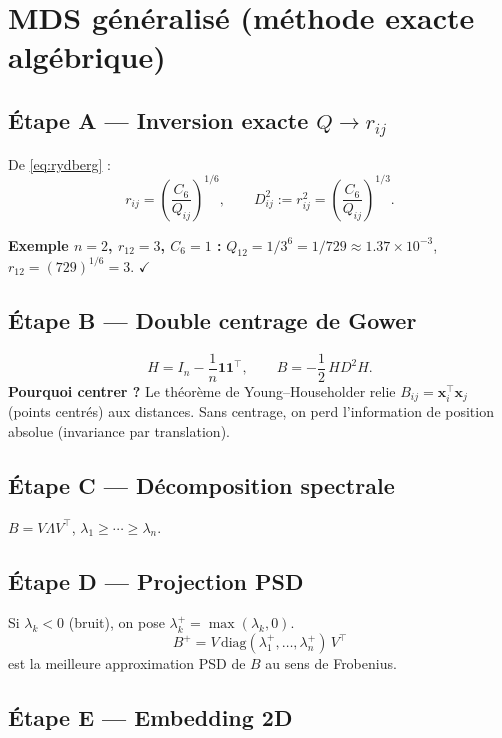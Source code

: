 \documentclass[12pt,a4paper]{article}
\begin{document}
\section{MDS généralisé (méthode exacte algébrique)}

\subsection{Étape A --- Inversion exacte $Q \to r_{ij}$}

De \eqref{eq:rydberg} :
\[
  r_{ij} = \left(\frac{C_6}{Q_{ij}}\right)^{1/6},
  \qquad
  D^2_{ij} := r_{ij}^2 = \left(\frac{C_6}{Q_{ij}}\right)^{1/3}.
\]

\textbf{Exemple $n=2$, $r_{12}=3$, $C_6=1$ :}
$Q_{12} = 1/3^6 = 1/729 \approx 1.37\times 10^{-3}$,
$r_{12} = (729)^{1/6} = 3$. $\checkmark$

\subsection{Étape B --- Double centrage de Gower}

\[
  H = I_n - \frac{1}{n}\mathbf{1}\mathbf{1}^\top,
  \qquad
  B = -\frac{1}{2}\,H D^2 H.
\]
\textbf{Pourquoi centrer ?} Le théorème de Young--Householder relie
$B_{ij} = \mathbf{x}_i^\top\mathbf{x}_j$ (points centrés) aux distances.
Sans centrage, on perd l'information de position absolue (invariance
par translation).

\subsection{Étape C --- Décomposition spectrale}

$B = V\Lambda V^\top$, $\lambda_1 \geq \cdots \geq \lambda_n$.

\subsection{Étape D --- Projection PSD}

Si $\lambda_k < 0$ (bruit), on pose $\lambda_k^+ = \max(\lambda_k, 0)$.
\[
  B^+ = V\,\mathrm{diag}(\lambda_1^+,\ldots,\lambda_n^+)\,V^\top
\]
est la meilleure approximation PSD de $B$ au sens de Frobenius.

\subsection{Étape E --- Embedding 2D}
\end{document}
